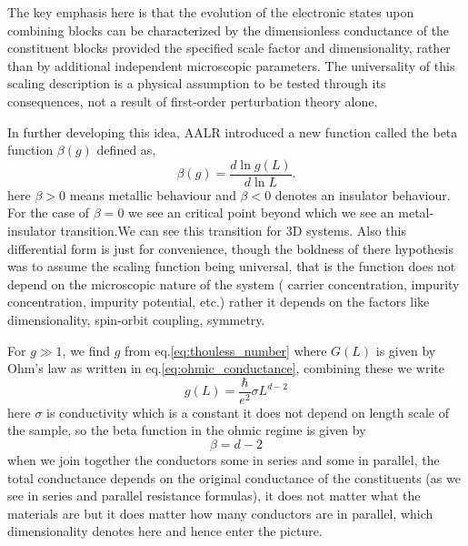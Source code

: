 The key emphasis here is that the evolution of the electronic states upon combining blocks can be characterized by the dimensionless conductance of the constituent blocks provided the specified scale factor and dimensionality, rather than by additional independent microscopic parameters. The universality of this scaling description is a physical assumption to be tested through its consequences, not a result of first-order perturbation theory alone.

In further developing this idea, AALR introduced a new function called the beta function $\beta(g)$ defined as\cite{AALR1979},
\begin{equation}
    \beta(g)
    =\frac{d\ln g(L)}{d\ln L}.
    \label{eq:aalr_beta_function}
\end{equation}
here $\beta >0$ means metallic behaviour and $\beta<0 $ denotes an insulator behaviour. For the case of $\beta=0$ we see an critical point beyond which we see an metal-insulator transition.We can see this transition for 3D systems. Also this differential form is just for convenience, though the boldness of there hypothesis was to assume the scaling function being universal, that is the function does not depend on the microscopic nature of the system ( carrier concentration, impurity concentration, impurity potential, etc.) rather it depends on the factors like dimensionality, spin-orbit coupling, symmetry.

For $g \gg 1$, we find $g$ from eq.\ref{eq:thouless_number} where $G(L)$ is given by Ohm's law as written in eq.\ref{eq:ohmic_conductance}, combining these we write
\[g(L)= \frac{\hbar}{e^2} \sigma L^{d-2}\]
here $\sigma$ is conductivity which is a constant it does not depend on length scale of the sample, so the beta function in the ohmic regime is given by
\begin{equation}
    \beta=d-2
    \label{eq:ohmic_regime}
\end{equation}
when we join together the conductors some in series and some in parallel, the total conductance depends on the original conductance of the constituents (as we see in series and parallel resistance formulas), it does not matter what the materials are but it does matter how many conductors are in parallel, which dimensionality denotes here and hence enter the picture. 

